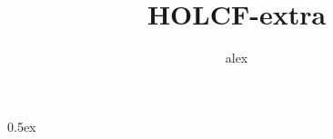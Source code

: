 \documentclass[11pt,a4paper]{article}
\begin{document}
\title{HOLCF-extra}
\author{alex}
\maketitle

\tableofcontents

\parindent 0pt\parskip 0.5ex



%
%
\end{document}
